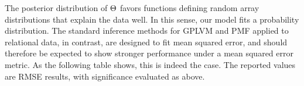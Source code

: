 The posterior distribution of $\Theta$ favors functions defining random array distributions that explain the data well.
In this sense, our model fits a probability distribution.
The standard inference methods for GPLVM and PMF applied to relational data, in contrast, are designed to fit mean squared error, and should therefore be expected to show stronger performance under a mean squared error metric.
As the following table shows, this is indeed the case.
The reported values are RMSE results, with significance evaluated as above.


